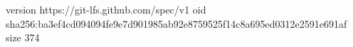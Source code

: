 version https://git-lfs.github.com/spec/v1
oid sha256:ba3ef4cd094094fe9e7d901985ab92e8759525f14c8a695ed0312e2591e691af
size 374
